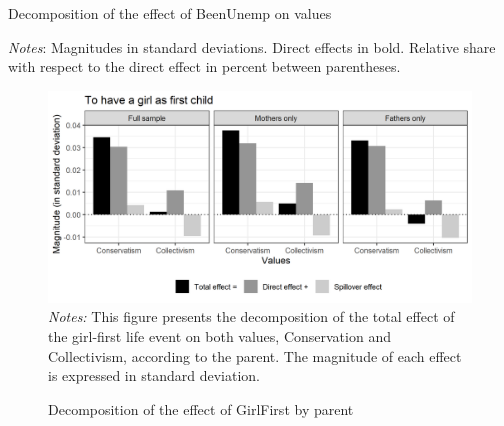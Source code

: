 \begin{table}[!htb]
    \centering
    \caption{Decomposition of the effect of BeenUnemp on values}
    \label{chap3-tab:decomp-BU}
    \begin{threeparttable}
        \setlength{\tabcolsep}{12pt}
        
        \begin{tablenotes}[flushleft]
            \footnotesize{\item \textit{Notes}: Magnitudes in standard deviations. Direct effects in bold. Relative share with respect to the direct effect in percent between parentheses.}
        \end{tablenotes}
    \end{threeparttable}
\end{table}

\begin{figure}[!htb]
    \centering
    \caption{Decomposition of the effect of GirlFirst by parent}
    \label{chap3-fig:sem-decomp-v5-GFGender}
    \includegraphics[width=\linewidth]{chap3/graphic/decomp-v5-GFGender.png}
    \hrulefill
	\vspace{-3em}
	\justify\singlespacing\footnotesize{\textit{Notes:} This figure presents the decomposition of the total effect of the girl-first life event on both values, Conservation and Collectivism, according to the parent. The magnitude of each effect is expressed in standard deviation.}
\end{figure}

